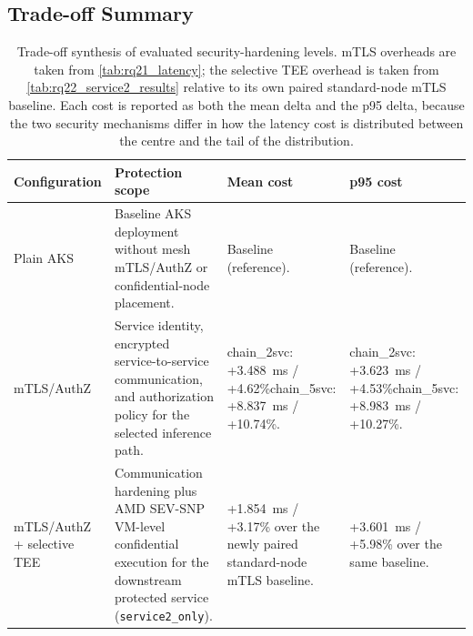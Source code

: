 \subsection{Trade-off Summary}

\begin{table}[!htbp]
\centering
\caption[Trade-off synthesis of security-hardening levels]{Trade-off synthesis of evaluated security-hardening levels. mTLS overheads are taken from \cref{tab:rq21_latency}; the selective TEE overhead is taken from \cref{tab:rq22_service2_results} relative to its own paired standard-node mTLS baseline. Each cost is reported as both the mean delta and the p95 delta, because the two security mechanisms differ in how the latency cost is distributed between the centre and the tail of the distribution.}
\label{tab:rq23_security_tradeoff}
\begingroup
\small
\setlength{\tabcolsep}{3pt}
\begin{tabular}{>{\raggedright\arraybackslash}p{}>{\raggedright\arraybackslash}p{}>{\raggedright\arraybackslash}p{}>{\raggedright\arraybackslash}p{}}
\toprule
\mbox{Configuration} & Protection scope & Mean cost & p95 cost \\
\midrule
Plain AKS
& Baseline AKS deployment without mesh mTLS/AuthZ or confidential-node placement.
& Baseline (reference).
& Baseline (reference). \\
\addlinespace
\mbox{mTLS/AuthZ}
& Service identity, encrypted service-to-service communication, and authorization policy for the selected inference path.
& chain\_2svc: +3.488~ms / +4.62\%\newline chain\_5svc: +8.837~ms / +10.74\%.
& chain\_2svc: +3.623~ms / +4.53\%\newline chain\_5svc: +8.983~ms / +10.27\%. \\
\addlinespace
\mbox{mTLS/AuthZ} + selective TEE
& Communication hardening plus AMD SEV-SNP VM-level confidential execution for the downstream protected service (\texttt{service2\_only}).
& +1.854~ms / +3.17\% over the newly paired standard-node mTLS baseline.
& +3.601~ms / +5.98\% over the same baseline. \\
\bottomrule
\end{tabular}
\endgroup
\end{table}

